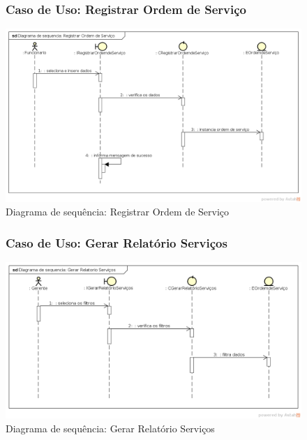 \documentclass[
	12pt,				%
	openright,
	oneside,			%
	a4paper,			%
	chapter=TITLE,		%
	brazil				%
	]{abntex2}
\begin{document}
\begin{figure}[h!]

\subsubsection*{Caso de Uso: Registrar Ordem de Serviço}

	\caption{Diagrama de sequência: Registrar Ordem de Serviço}
	\begin{center}
	    \includegraphics[scale=0.5]{Arquivos/Analise/D_registrar_ordem_servico}  
	\end{center}
\end{figure}






\begin{figure}[h!]

\subsubsection*{Caso de Uso: Gerar Relatório Serviços}

	\caption{Diagrama de sequência: Gerar Relatório Serviços}
	\begin{center}
	    \includegraphics[scale=0.5]{Arquivos/Analise/D_relatorio_servicos}  
	\end{center}
\end{figure}
\end{document}
